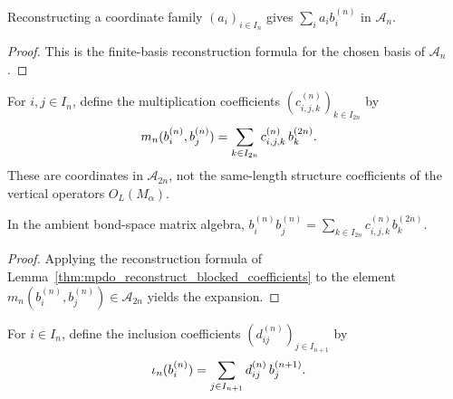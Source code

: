 \begin{lemma}%
    \label{thm:mpdo_reconstruct_blocked_coefficients}
    \leanok
    Reconstructing a coordinate family $(a_i)_{i\in I_n}$ gives
    $\sum_i a_i b_i^{(n)}$ in $\mathcal{A}_n$.
\end{lemma}
\begin{proof}\leanok
    This is the finite-basis reconstruction formula for the chosen basis of
    $\mathcal{A}_n$.
\end{proof}

\begin{definition}%
    \label{def:mpdo_blocked_structure_coefficients}
    \leanok
    For $i,j \in I_n$, define the multiplication coefficients
    $(c^{(n)}_{i,j,k})_{k \in I_{2n}}$ by
    \begin{align}
        m_n(b_i^{(n)},b_j^{(n)})
         & = \sum_{k \in I_{2n}} c^{(n)}_{i,j,k}\, b_k^{(2n)}.
        \notag
    \end{align}
    These are coordinates in $\mathcal{A}_{2n}$, not the same-length
    structure coefficients of the vertical operators $O_L(M_\alpha)$.
\end{definition}

\begin{lemma}%
    \label{thm:mpdo_mul_coefficients_reconstruct}
    \leanok
    In the ambient bond-space matrix algebra,
    $b_i^{(n)} b_j^{(n)}
        = \sum_{k \in I_{2n}} c^{(n)}_{i,j,k} b_k^{(2n)}$.
\end{lemma}
\begin{proof}\leanok
    Applying the reconstruction formula of
    Lemma~\ref{thm:mpdo_reconstruct_blocked_coefficients} to the element
    $m_n(b_i^{(n)},b_j^{(n)}) \in \mathcal{A}_{2n}$ yields the expansion.
\end{proof}

\begin{definition}%
    \label{def:mpdo_blocked_inclusion_coefficients}
    \leanok
    For $i \in I_n$, define the inclusion coefficients
    $(d^{(n)}_{ij})_{j \in I_{n+1}}$ by
    \begin{align}
        \iota_n(b_i^{(n)})
         & = \sum_{j \in I_{n+1}} d^{(n)}_{ij}\, b_j^{(n+1)}.
        \notag
    \end{align}
\end{definition}

